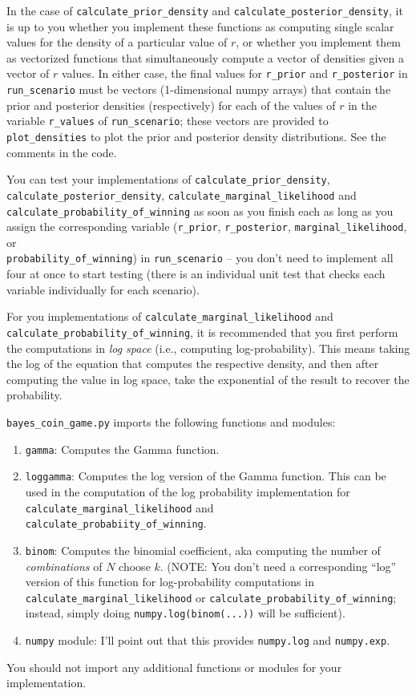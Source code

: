 \documentclass[10pt]{article}
\begin{document}
\begin{itemize}
In the case of {\tt calculate\_prior\_density} and {\tt calculate\_posterior\_density}, it is up to you whether you implement these functions as computing single scalar values for the density of a particular value of $r$, or whether you implement them as vectorized functions that simultaneously compute a vector of densities given a vector of $r$ values. In either case, the final values for {\tt r\_prior} and {\tt r\_posterior} in {\tt run\_scenario} must be vectors (1-dimensional numpy arrays) that contain the prior and posterior densities (respectively) for each of the values of $r$ in the variable {\tt r\_values} of {\tt run\_scenario}; these vectors are provided to {\tt plot\_densities} to plot the prior and posterior density distributions. See the comments in the code.

You can test your implementations of {\tt calculate\_prior\_density}, {\tt calculate\_posterior\_density}, {\tt calculate\_marginal\_likelihood} and {\tt calculate\_probability\_of\_winning} as soon as you finish each as long as you assign the corresponding variable 
({\tt r\_prior}, 
{\tt r\_posterior}, 
{\tt marginal\_likelihood}, or \\
{\tt probability\_of\_winning}) 
in {\tt run\_scenario} -- you don't need to implement all four at once to start testing (there is an individual unit test that checks each variable individually for each scenario).

For you implementations of {\tt calculate\_marginal\_likelihood} and {\tt calculate\_probability\_of\_winning}, it is recommended that you first perform the computations in {\em log space} (i.e., computing log-probability). This means taking the log of the equation that computes the respective density, and then after computing the value in log space, take the exponential of the result to recover the probability. 

{\tt bayes\_coin\_game.py} imports the following functions and modules:
\begin{enumerate}
\item {\tt gamma}: Computes the Gamma function.
\item {\tt loggamma}: Computes the log version of the Gamma function. This can be used in the computation of the log probability implementation for {\tt calculate\_marginal\_likelihood} and \\ {\tt calculate\_probabiity\_of\_winning}.
\item {\tt binom}: Computes the binomial coefficient, aka computing the number of {\em combinations} of $N$ choose $k$. (NOTE: You don't need a corresponding ``log'' version of this function for log-probability computations in {\tt calculate\_marginal\_likelihood} or {\tt calculate\_probability\_of\_winning}; instead, simply doing {\tt numpy.log(binom(...))} will be sufficient).
\item {\tt numpy} module: I'll point out that this provides {\tt numpy.log} and {\tt numpy.exp}. 
\end{enumerate}
You should not import any additional functions or modules for your implementation.


\end{itemize}
\end{document}
